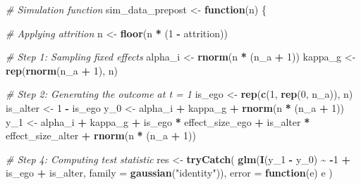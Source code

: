 \documentclass[
]{book}
\newenvironment{Shaded}{\begin{snugshade}}{\end{snugshade}}
\newcommand{\AttributeTok}[1]{\textcolor[rgb]{0.13,0.29,0.53}{#1}}
\newcommand{\CommentTok}[1]{\textcolor[rgb]{0.56,0.35,0.01}{\textit{#1}}}
\newcommand{\ControlFlowTok}[1]{\textcolor[rgb]{0.13,0.29,0.53}{\textbf{#1}}}
\newcommand{\DecValTok}[1]{\textcolor[rgb]{0.00,0.00,0.81}{#1}}
\newcommand{\FunctionTok}[1]{\textcolor[rgb]{0.13,0.29,0.53}{\textbf{#1}}}
\newcommand{\NormalTok}[1]{#1}
\newcommand{\OtherTok}[1]{\textcolor[rgb]{0.56,0.35,0.01}{#1}}
\newcommand{\SpecialCharTok}[1]{\textcolor[rgb]{0.81,0.36,0.00}{\textbf{#1}}}
\newcommand{\StringTok}[1]{\textcolor[rgb]{0.31,0.60,0.02}{#1}}
\begin{document}
\begin{Shaded}
\begin{Highlighting}[]
\CommentTok{\# Simulation function}
\NormalTok{sim\_data\_prepost }\OtherTok{\textless{}{-}} \ControlFlowTok{function}\NormalTok{(n) \{}

  \CommentTok{\# Applying attrition}
\NormalTok{  n }\OtherTok{\textless{}{-}} \FunctionTok{floor}\NormalTok{(n }\SpecialCharTok{*}\NormalTok{ (}\DecValTok{1} \SpecialCharTok{{-}}\NormalTok{ attrition))}

  \CommentTok{\# Step 1: Sampling fixed effects}
\NormalTok{  alpha\_i }\OtherTok{\textless{}{-}} \FunctionTok{rnorm}\NormalTok{(n }\SpecialCharTok{*}\NormalTok{ (n\_a }\SpecialCharTok{+} \DecValTok{1}\NormalTok{))}
\NormalTok{  kappa\_g }\OtherTok{\textless{}{-}} \FunctionTok{rep}\NormalTok{(}\FunctionTok{rnorm}\NormalTok{(n\_a }\SpecialCharTok{+} \DecValTok{1}\NormalTok{), n)}

  \CommentTok{\# Step 2: Generating the outcome at t = 1}
\NormalTok{  is\_ego   }\OtherTok{\textless{}{-}} \FunctionTok{rep}\NormalTok{(}\FunctionTok{c}\NormalTok{(}\DecValTok{1}\NormalTok{, }\FunctionTok{rep}\NormalTok{(}\DecValTok{0}\NormalTok{, n\_a)), n)}
\NormalTok{  is\_alter }\OtherTok{\textless{}{-}} \DecValTok{1} \SpecialCharTok{{-}}\NormalTok{ is\_ego}
\NormalTok{  y\_0      }\OtherTok{\textless{}{-}}\NormalTok{ alpha\_i }\SpecialCharTok{+}\NormalTok{ kappa\_g }\SpecialCharTok{+} \FunctionTok{rnorm}\NormalTok{(n }\SpecialCharTok{*}\NormalTok{ (n\_a }\SpecialCharTok{+} \DecValTok{1}\NormalTok{))}
\NormalTok{  y\_1      }\OtherTok{\textless{}{-}}\NormalTok{ alpha\_i }\SpecialCharTok{+}\NormalTok{ kappa\_g }\SpecialCharTok{+}
\NormalTok{    is\_ego }\SpecialCharTok{*}\NormalTok{ effect\_size\_ego }\SpecialCharTok{+}
\NormalTok{    is\_alter }\SpecialCharTok{*}\NormalTok{ effect\_size\_alter }\SpecialCharTok{+} 
    \FunctionTok{rnorm}\NormalTok{(n }\SpecialCharTok{*}\NormalTok{ (n\_a }\SpecialCharTok{+} \DecValTok{1}\NormalTok{)) }

  \CommentTok{\# Step 4: Computing test statistic}
\NormalTok{  res }\OtherTok{\textless{}{-}} \FunctionTok{tryCatch}\NormalTok{(}
    \FunctionTok{glm}\NormalTok{(}\FunctionTok{I}\NormalTok{(y\_1 }\SpecialCharTok{{-}}\NormalTok{ y\_0) }\SpecialCharTok{\textasciitilde{}} \SpecialCharTok{{-}}\DecValTok{1} \SpecialCharTok{+}\NormalTok{ is\_ego }\SpecialCharTok{+}\NormalTok{ is\_alter, }\AttributeTok{family =} \FunctionTok{gaussian}\NormalTok{(}\StringTok{"identity"}\NormalTok{)),}
    \AttributeTok{error =} \ControlFlowTok{function}\NormalTok{(e) e}
\NormalTok{  )}


\end{Highlighting}
\end{Shaded}
\end{document}
